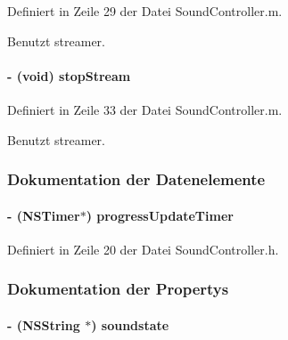 Definiert in Zeile 29 der Datei SoundController.m.

Benutzt streamer.\hypertarget{interface_sound_controller_aff4b12f990cd30515c83f12942f957f3}{
\paragraph[{stopStream}]{\setlength{\rightskip}{0pt plus 5cm}-\/ (void) stopStream }\hfill}
\label{interface_sound_controller_aff4b12f990cd30515c83f12942f957f3}


Definiert in Zeile 33 der Datei SoundController.m.

Benutzt streamer.

\subsubsection{Dokumentation der Datenelemente}
\hypertarget{interface_sound_controller_a9a7042c00cd9fbe5fdc18719360d0b89}{
\paragraph[{progressUpdateTimer}]{\setlength{\rightskip}{0pt plus 5cm}-\/ (NSTimer$\ast$) {\bf progressUpdateTimer}}\hfill}
\label{interface_sound_controller_a9a7042c00cd9fbe5fdc18719360d0b89}


Definiert in Zeile 20 der Datei SoundController.h.

\subsubsection{Dokumentation der Propertys}
\hypertarget{interface_sound_controller_a1fc59135a0c0376ae7cb7847f6265db7}{
\paragraph[{soundstate}]{\setlength{\rightskip}{0pt plus 5cm}-\/ (NSString $\ast$) soundstate}\hfill}
\label{interface_sound_controller_a1fc59135a0c0376ae7cb7847f6265db7}


